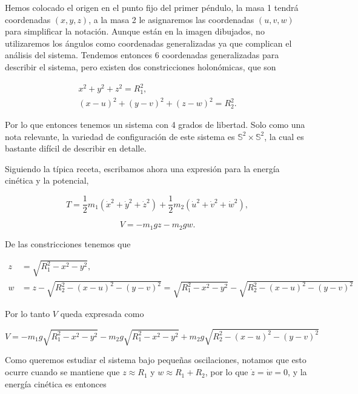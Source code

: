 \documentclass[a4paper,10pt]{article}
\numberwithin{equation}{section}
\begin{document}
Hemos colocado el origen en el punto fijo del primer péndulo, la masa 1 tendrá 
coordenadas $(x,y,z)$, a la masa 2 le asignaremos las coordenadas 
$(u,v,w)$ para simplificar la notación. Aunque están en la imagen dibujados, 
no utilizaremos los ángulos como coordenadas generalizadas ya que complican 
el análisis del sistema. Tendemos entonces 6 coordenadas generalizadas para 
describir el sistema, pero existen dos constricciones holonómicas, que son 

\begin{align}
 x^2 + y^2 + z^2 = R_1^2, \\
 (x - u)^2 + (y-v)^2 + (z-w)^2 = R_2^2.
\end{align}

Por lo que entonces tenemos un sistema con 4 grados de libertad. Solo como una nota relevante, 
la variedad de configuración de este sistema es $\mathbb{S}^2 \times \mathbb{S}^2$, 
la cual es bastante difícil de describir en detalle.

\vspace{.3cm}

Siguiendo la típica receta, escribamos ahora una expresión para la energía cinética y 
la potencial,

\begin{equation}
 T = \frac{1}{2}m_1(\dot{x}^2+\dot{y}^2+\dot{z}^2) 
 + \frac{1}{2}m_2(\dot{u}^2+\dot{v}^2+\dot{w}^2),
\end{equation}

\begin{equation}
 V = - m_1gz - m_2gw.
\end{equation}

De las constricciones tenemos que 

\begin{align*}
 z &= \sqrt{R_1^2 - x^2 - y^2}, \\
 w &= z - \sqrt{R_2^2 - (x-u)^2 - (y-v)^2} = \sqrt{R_1^2 - x^2 - y^2} - 
 \sqrt{R_2^2 - (x-u)^2 - (y-v)^2}
\end{align*}

Por lo tanto $V$ queda expresada como 

\begin{equation}
 V = - m_1g\sqrt{R_1^2 - x^2 - y^2} - m_2g\sqrt{R_1^2 - x^2 - y^2} + 
 m_2 g  \sqrt{R_2^2 - (x-u)^2 - (y-v)^2}
 \label{eq:energPotenDoble}
\end{equation}

Como queremos estudiar el sistema bajo pequeñas oscilaciones, notamos que esto ocurre 
cuando se mantiene que $z \approx R_1$ y $w \approx R_1 + R_2$, por lo que $\dot{z} = 
\dot{w} = 0$, y la energía cinética es entonces 
\end{document}
